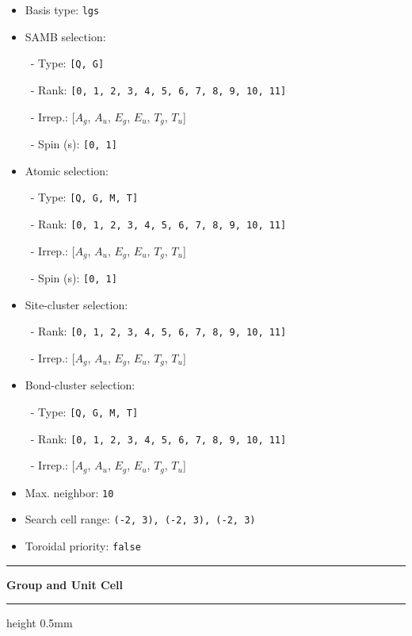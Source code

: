 \documentclass[fleqn,10pt,landscape]{jsarticle}
\begin{document}
\begin{itemize}
\item Basis type: \texttt{lgs}

\item SAMB selection:

\, - Type: \texttt{[Q, G]}

\, - Rank: \texttt{[0, 1, 2, 3, 4, 5, 6, 7, 8, 9, 10, 11]}

\, - Irrep.: [$A_{g}$, $A_{u}$, $E_{g}$, $E_{u}$, $T_{g}$, $T_{u}$]

\, - Spin (s): \texttt{[0, 1]}

\item Atomic selection:

\, - Type: \texttt{[Q, G, M, T]}

\, - Rank: \texttt{[0, 1, 2, 3, 4, 5, 6, 7, 8, 9, 10, 11]}

\, - Irrep.: [$A_{g}$, $A_{u}$, $E_{g}$, $E_{u}$, $T_{g}$, $T_{u}$]

\, - Spin (s): \texttt{[0, 1]}

\item Site-cluster selection:

\, - Rank: \texttt{[0, 1, 2, 3, 4, 5, 6, 7, 8, 9, 10, 11]}

\, - Irrep.: [$A_{g}$, $A_{u}$, $E_{g}$, $E_{u}$, $T_{g}$, $T_{u}$]

\item Bond-cluster selection:

\, - Type: \texttt{[Q, G, M, T]}

\, - Rank: \texttt{[0, 1, 2, 3, 4, 5, 6, 7, 8, 9, 10, 11]}

\, - Irrep.: [$A_{g}$, $A_{u}$, $E_{g}$, $E_{u}$, $T_{g}$, $T_{u}$]

\item Max. neighbor: \texttt{10}

\item Search cell range: \texttt{(-2, 3), (-2, 3), (-2, 3)}

\item Toroidal priority: \texttt{false}

\end{itemize}
\vspace{5mm}
\noindent \rule[0.5mm]{5mm}{0.5mm}\hspace{3mm}\textbf{Group and Unit Cell}\hspace{3mm}\leaders\hrule height 0.5mm\hfill\kern0pt
\vspace{3mm}
\end{document}

